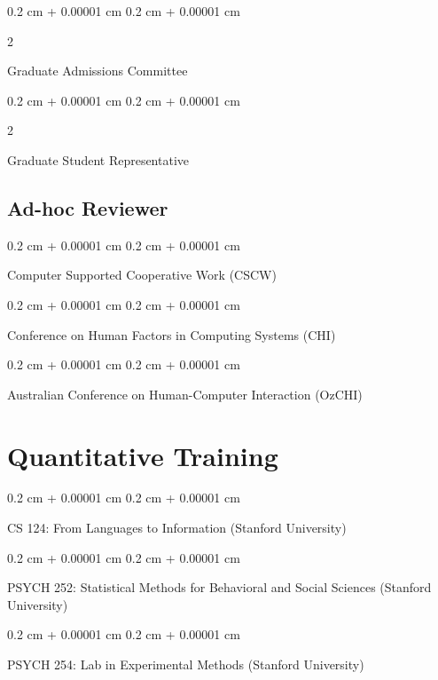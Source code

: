 \documentclass[10pt, letterpaper]{article}
\newenvironment{onecolentry}{
    \begin{adjustwidth}{
        0.2 cm + 0.00001 cm
    }{
        0.2 cm + 0.00001 cm
    }
}{
    \end{adjustwidth}
} %
\newenvironment{twocolentry}[2][]{
    \onecolentry
    \def\secondColumn{#2}
    \setcolumnwidth{\fill, 4.5 cm}
    \begin{paracol}{2}
}{
    \switchcolumn \raggedleft \secondColumn
    \end{paracol}
    \endonecolentry
} %
\begin{document}
        \vspace{0.2 cm}
        \begin{twocolentry}{2018
        }
        Graduate Admissions Committee
        \end{twocolentry}
        \begin{twocolentry}{2018
        }
        Graduate Student Representative
        \end{twocolentry}

        
\subsection{Ad-hoc Reviewer}
    \begin{onecolentry}
    Computer Supported Cooperative Work (CSCW)
    \end{onecolentry}

        \vspace{0.2 cm}

\begin{onecolentry}
Conference on Human Factors in Computing Systems (CHI)
\end{onecolentry}

        \vspace{0.2 cm}

\begin{onecolentry}
Australian Conference on Human-Computer Interaction (OzCHI)
\end{onecolentry}

\section{Quantitative Training}
\vspace{0.2 cm}
\begin{onecolentry}
CS 124: From Languages to Information (Stanford University)
\end{onecolentry}

\vspace{0.2 cm}
\begin{onecolentry}
PSYCH 252: Statistical Methods for Behavioral and Social Sciences (Stanford University)
\end{onecolentry}
        \vspace{0.2 cm}
\begin{onecolentry}
PSYCH 254: Lab in Experimental Methods (Stanford University)
\end{onecolentry}
\vspace{0.2 cm}
\end{document}
